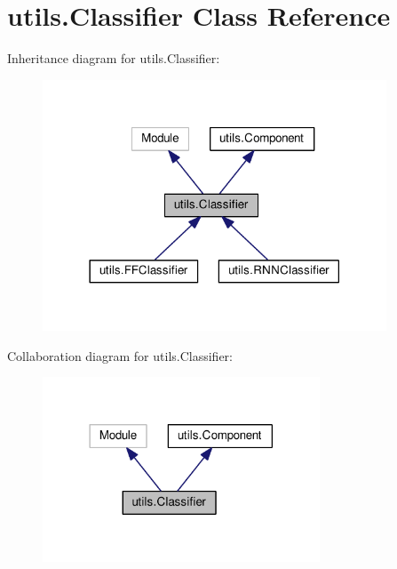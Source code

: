 \hypertarget{classutils_1_1Classifier}{}\section{utils.\+Classifier Class Reference}
\label{classutils_1_1Classifier}


Inheritance diagram for utils.\+Classifier\+:
\nopagebreak
\begin{figure}[H]
\begin{center}
\leavevmode
\includegraphics[width=290pt]{classutils_1_1Classifier__inherit__graph}
\end{center}
\end{figure}


Collaboration diagram for utils.\+Classifier\+:
\nopagebreak
\begin{figure}[H]
\begin{center}
\leavevmode
\includegraphics[width=234pt]{classutils_1_1Classifier__coll__graph}
\end{center}
\end{figure}
